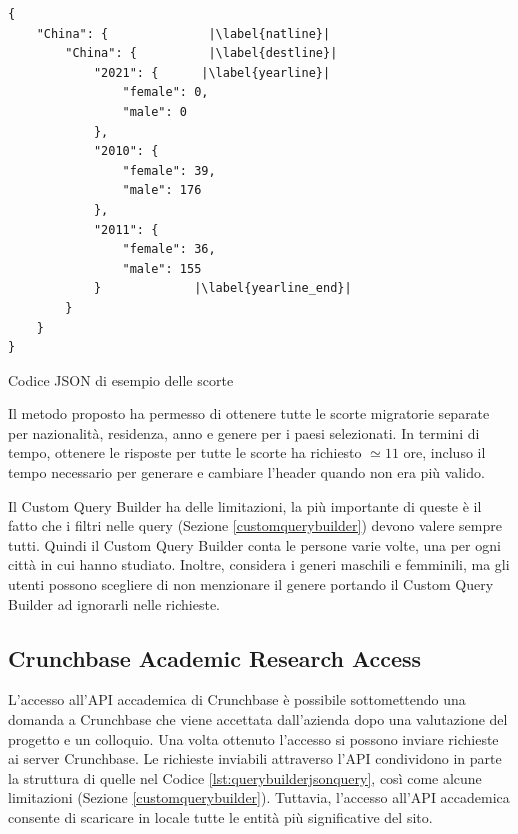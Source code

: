 \begin{listing}[htbp]
\begin{verbatim}
{
    "China": {              |\label{natline}|
        "China": {          |\label{destline}|
            "2021": {      |\label{yearline}|
                "female": 0,
                "male": 0
            },
            "2010": {
                "female": 39,
                "male": 176
            },
            "2011": {
                "female": 36,
                "male": 155
            }             |\label{yearline_end}|
        }
    }
}
\end{verbatim}
\caption{Codice JSON di esempio delle scorte}
\label{lst:stock_data}
\end{listing}


Il metodo proposto ha permesso di ottenere tutte le scorte migratorie separate per nazionalità, residenza, anno e genere per i paesi selezionati.
In termini di tempo, ottenere le risposte per tutte le scorte ha richiesto \(\simeq 11\) ore, incluso il tempo necessario per generare e cambiare l'header quando non era più valido.


Il Custom Query Builder ha delle limitazioni, la più importante di queste è il fatto che i filtri nelle query (Sezione \ref{customquerybuilder}) devono valere sempre tutti. Quindi il Custom Query Builder conta le persone varie volte, una per ogni città in cui hanno studiato. Inoltre, considera i generi maschili e femminili, ma gli utenti possono scegliere di non menzionare il genere portando il Custom Query Builder ad ignorarli nelle richieste.


\subsection{Crunchbase Academic Research Access}
\label{academic_access_section}
L'accesso all'API accademica di Crunchbase è possibile sottomettendo una domanda a Crunchbase che viene accettata dall'azienda dopo una valutazione del progetto e un colloquio. Una volta ottenuto l'accesso si possono inviare richieste ai server Crunchbase. Le richieste inviabili attraverso l'API condividono in parte la struttura di quelle nel Codice \ref{lst:querybuilderjsonquery}, così come alcune limitazioni (Sezione \ref{customquerybuilder}).
Tuttavia, l'accesso all'API accademica consente di scaricare in locale tutte le entità più significative del sito.

